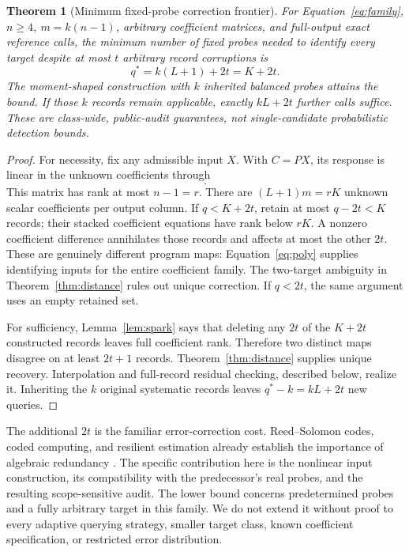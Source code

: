 \documentclass[11pt,letterpaper]{article}
\newtheorem{theorem}{Theorem}[section]
\theoremstyle{remark}\newtheorem{remark}{Remark}[section]
\begin{document}
\begin{theorem}[Minimum fixed-probe correction frontier]\label{thm:main}
For Equation~\eqref{eq:family}, $n\ge4$, $m=k(n-1)$, arbitrary coefficient matrices, and full-output exact reference calls, the minimum number of \emph{fixed} probes needed to identify every target despite at most $t$ arbitrary record corruptions is
\begin{equation}
 \boxed{\quad q^*=k(L+1)+2t=K+2t.\quad}\label{eq:threshold}
\end{equation}
The moment-shaped construction with $k$ inherited balanced probes attains the bound. If those $k$ records remain applicable, exactly $kL+2t$ further calls suffice. These are class-wide, public-audit guarantees, not single-candidate probabilistic detection bounds.
\end{theorem}
\begin{proof}
For necessity, fix any admissible input $X$. With $C=PX$, its response is linear in the unknown coefficients through
\begin{equation}
 [C\ s(C)C\ \cdots\ s(C)^LC].
\end{equation}
This matrix has rank at most $n-1=r$. There are $(L+1)m=rK$ unknown scalar coefficients per output column. If $q<K+2t$, retain at most $q-2t<K$ records; their stacked coefficient equations have rank below $rK$. A nonzero coefficient difference annihilates those records and affects at most the other $2t$. These are genuinely different program maps: Equation~\eqref{eq:poly} supplies identifying inputs for the entire coefficient family. The two-target ambiguity in Theorem~\ref{thm:distance} rules out unique correction. If $q<2t$, the same argument uses an empty retained set.

For sufficiency, Lemma~\ref{lem:spark} says that deleting any $2t$ of the $K+2t$ constructed records leaves full coefficient rank. Therefore two distinct maps disagree on at least $2t+1$ records. Theorem~\ref{thm:distance} supplies unique recovery. Interpolation and full-record residual checking, described below, realize it. Inheriting the $k$ original systematic records leaves $q^*-k=kL+2t$ new queries.
\end{proof}

The additional $2t$ is the familiar error-correction cost. Reed--Solomon codes, coded computing, and resilient estimation already establish the importance of algebraic redundancy \citep{reed,lcc,fawzi}. The specific contribution here is the nonlinear input construction, its compatibility with the predecessor's real probes, and the resulting scope-sensitive audit. The lower bound concerns predetermined probes and a fully arbitrary target in this family. We do not extend it without proof to every adaptive querying strategy, smaller target class, known coefficient specification, or restricted error distribution.
\end{document}
